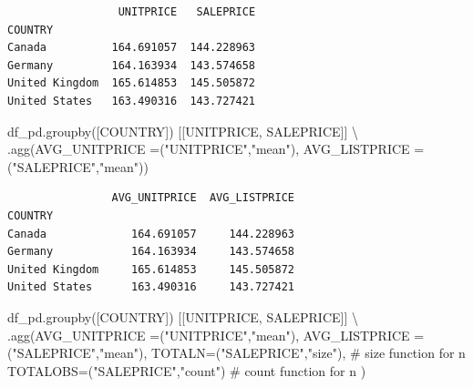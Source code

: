 \documentclass[
  letterpaper,
  DIV=11,
  numbers=noendperiod]{scrreprt}
\newenvironment{Shaded}{\begin{snugshade}}{\end{snugshade}}
\newcommand{\CommentTok}[1]{\textcolor[rgb]{0.37,0.37,0.37}{#1}}
\newcommand{\NormalTok}[1]{\textcolor[rgb]{0.00,0.23,0.31}{#1}}
\newcommand{\OperatorTok}[1]{\textcolor[rgb]{0.37,0.37,0.37}{#1}}
\newcommand{\StringTok}[1]{\textcolor[rgb]{0.13,0.47,0.30}{#1}}
\begin{document}
\begin{verbatim}
                 UNITPRICE   SALEPRICE
COUNTRY                               
Canada          164.691057  144.228963
Germany         164.163934  143.574658
United Kingdom  165.614853  145.505872
United States   163.490316  143.727421
\end{verbatim}

\begin{Shaded}
\begin{Highlighting}[]
\NormalTok{df\_pd.groupby([}\StringTok{\textquotesingle{}COUNTRY\textquotesingle{}}\NormalTok{]) [[}\StringTok{\textquotesingle{}UNITPRICE\textquotesingle{}}\NormalTok{, }\StringTok{\textquotesingle{}SALEPRICE\textquotesingle{}}\NormalTok{]] }\OperatorTok{\textbackslash{}}
\NormalTok{    .agg(AVG\_UNITPRICE }\OperatorTok{=}\NormalTok{(}\StringTok{"UNITPRICE"}\NormalTok{,}\StringTok{"mean"}\NormalTok{),}
\NormalTok{    AVG\_LISTPRICE }\OperatorTok{=}\NormalTok{(}\StringTok{"SALEPRICE"}\NormalTok{,}\StringTok{"mean"}\NormalTok{))}
\end{Highlighting}
\end{Shaded}

\begin{verbatim}
                AVG_UNITPRICE  AVG_LISTPRICE
COUNTRY                                     
Canada             164.691057     144.228963
Germany            164.163934     143.574658
United Kingdom     165.614853     145.505872
United States      163.490316     143.727421
\end{verbatim}

\begin{Shaded}
\begin{Highlighting}[]
\NormalTok{df\_pd.groupby([}\StringTok{\textquotesingle{}COUNTRY\textquotesingle{}}\NormalTok{]) [[}\StringTok{\textquotesingle{}UNITPRICE\textquotesingle{}}\NormalTok{, }\StringTok{\textquotesingle{}SALEPRICE\textquotesingle{}}\NormalTok{]] }\OperatorTok{\textbackslash{}}
\NormalTok{    .agg(AVG\_UNITPRICE }\OperatorTok{=}\NormalTok{(}\StringTok{"UNITPRICE"}\NormalTok{,}\StringTok{"mean"}\NormalTok{),}
\NormalTok{    AVG\_LISTPRICE }\OperatorTok{=}\NormalTok{(}\StringTok{"SALEPRICE"}\NormalTok{,}\StringTok{"mean"}\NormalTok{),}
\NormalTok{    TOTALN}\OperatorTok{=}\NormalTok{(}\StringTok{"SALEPRICE"}\NormalTok{,}\StringTok{"size"}\NormalTok{), }\CommentTok{\# size function for n}
\NormalTok{    TOTALOBS}\OperatorTok{=}\NormalTok{(}\StringTok{"SALEPRICE"}\NormalTok{,}\StringTok{"count"}\NormalTok{) }\CommentTok{\# count function for n}
\NormalTok{ )}
\end{Highlighting}
\end{Shaded}
\end{document}
